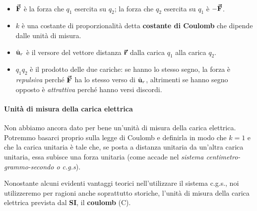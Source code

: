 \begin{observes}~
	\begin{itemize}
		\item $\vb*{\va{F}}$ è la forza che $q_1$ esercita su $q_2$; la forza che $q_2$ esercita su $q_1$ è $-\vb*{\va{F}}$.
		\item $k$ è una costante di proporzionalità detta \textbf{costante di Coulomb} che dipende dalle unità di misura.
		\item $\hat{\mathbf{u}}_r$ è il versore del vettore distanza $\vb*{\va{r}}$ dalla carica $q_1$ alla carica $q_2$.
		\item $q_1q_2$ è il prodotto delle due cariche: se hanno lo stesso segno, la forza è \textit{repulsiva} perché $\vb*{\va{F}}$ ha lo stesso verso di $\hat{\mathbf{u}}_r$, altrimenti se hanno segno opposto è \textit{attrattiva} perché hanno versi discordi.
	\end{itemize}
\end{observes}
\paragraph{Unità di misura della carica elettrica}
Non abbiamo ancora dato per bene un'unità di misura della carica elettrica. Potremmo basarci proprio sulla legge di Coulomb e definirla in modo che $k=1$ e che la carica unitaria è tale che, se posta a distanza unitaria da un'altra carica unitaria, essa subisce una forza unitaria (come accade nel \textit{sistema centimetro-grammo-secondo o c.g.s}).  

Nonostante alcuni evidenti vantaggi teorici nell'utilizzare il sistema c.g.s., noi utilizzeremo per ragioni anche soprattutto storiche, l'unità di misura della carica elettrica prevista dal \textbf{SI}, il \textbf{coulomb} ($\unit{\coulomb}$).

